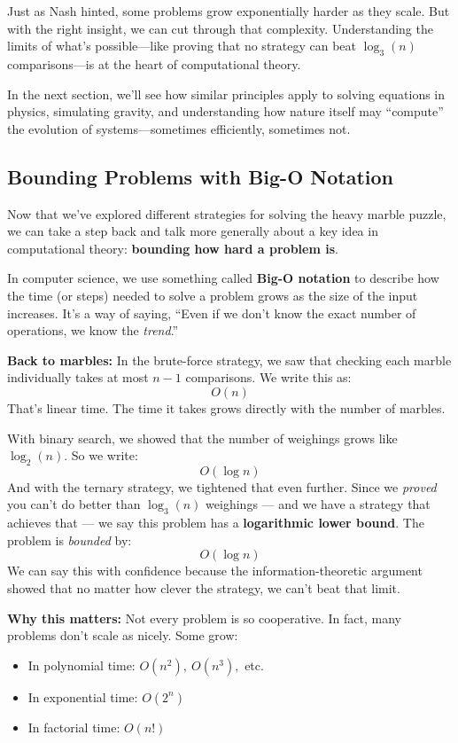 Just as Nash hinted, some problems grow exponentially harder as they scale. But with the right insight, we can cut through that complexity. Understanding the limits of what’s possible—like proving that no strategy can beat \( \log_3(n) \) comparisons—is at the heart of computational theory.

In the next section, we’ll see how similar principles apply to solving equations in physics, simulating gravity, and understanding how nature itself may ``compute'' the evolution of systems—sometimes efficiently, sometimes not.



\subsection{Bounding Problems with Big-O Notation}

Now that we’ve explored different strategies for solving the heavy marble puzzle, we can take a step back and talk more generally about a key idea in computational theory: \textbf{bounding how hard a problem is}.

In computer science, we use something called \textbf{Big-O notation} to describe how the time (or steps) needed to solve a problem grows as the size of the input increases. It’s a way of saying, “Even if we don’t know the exact number of operations, we know the \emph{trend}.”

\medskip

\noindent\textbf{Back to marbles:} In the brute-force strategy, we saw that checking each marble individually takes at most \( n - 1 \) comparisons. We write this as:
\[
O(n)
\]
That’s linear time. The time it takes grows directly with the number of marbles.

With binary search, we showed that the number of weighings grows like \( \log_2(n) \). So we write:
\[
O(\log n)
\]
And with the ternary strategy, we tightened that even further. Since we \textit{proved} you can’t do better than \( \log_3(n) \) weighings — and we have a strategy that achieves that — we say this problem has a \textbf{logarithmic lower bound}. The problem is \textit{bounded} by:
\[
O(\log n)
\]
We can say this with confidence because the information-theoretic argument showed that no matter how clever the strategy, we can't beat that limit.

\medskip

\noindent\textbf{Why this matters:} Not every problem is so cooperative. In fact, many problems don’t scale as nicely. Some grow:
\begin{itemize}
  \item In polynomial time: \( O(n^2),\ O(n^3), \) etc.
  \item In exponential time: \( O(2^n) \)
  \item In factorial time: \( O(n!) \)
\end{itemize}

